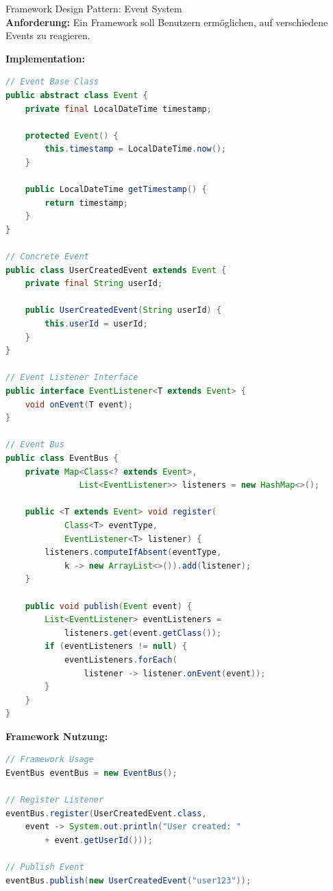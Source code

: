 \begin{example2}{Framework Design Pattern: Event System}\\
\textbf{Anforderung:}
Ein Framework soll Benutzern ermöglichen, auf verschiedene Events zu reagieren.

\textbf{Implementation:}
\begin{lstlisting}[language=Java, style=basesmol]
// Event Base Class
public abstract class Event {
    private final LocalDateTime timestamp;
    
    protected Event() {
        this.timestamp = LocalDateTime.now();
    }
    
    public LocalDateTime getTimestamp() {
        return timestamp;
    }
}

// Concrete Event
public class UserCreatedEvent extends Event {
    private final String userId;
    
    public UserCreatedEvent(String userId) {
        this.userId = userId;
    }
}

// Event Listener Interface
public interface EventListener<T extends Event> {
    void onEvent(T event);
}

// Event Bus
public class EventBus {
    private Map<Class<? extends Event>, 
               List<EventListener>> listeners = new HashMap<>();
    
    public <T extends Event> void register(
            Class<T> eventType, 
            EventListener<T> listener) {
        listeners.computeIfAbsent(eventType, 
            k -> new ArrayList<>()).add(listener);
    }
    
    public void publish(Event event) {
        List<EventListener> eventListeners = 
            listeners.get(event.getClass());
        if (eventListeners != null) {
            eventListeners.forEach(
                listener -> listener.onEvent(event));
        }
    }
}
\end{lstlisting}

\textbf{Framework Nutzung:}
\begin{lstlisting}[language=Java, style=basesmol]
// Framework Usage
EventBus eventBus = new EventBus();

// Register Listener
eventBus.register(UserCreatedEvent.class, 
    event -> System.out.println("User created: " 
        + event.getUserId()));

// Publish Event
eventBus.publish(new UserCreatedEvent("user123"));
\end{lstlisting}
\end{example2}